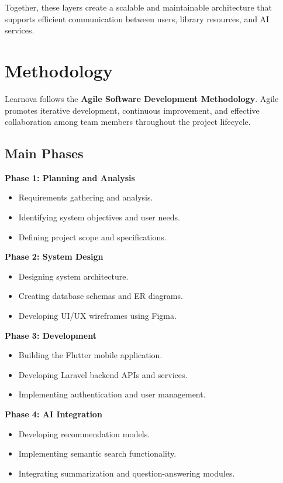 Together, these layers create a scalable and maintainable architecture that
supports efficient communication between users, library resources, and AI
services.

\section{Methodology}
\label{sec:methodology}

Learnova follows the \textbf{Agile Software Development Methodology}. Agile
promotes iterative development, continuous improvement, and effective
collaboration among team members throughout the project lifecycle.

\subsection{Main Phases}

\textbf{Phase 1: Planning and Analysis}
\begin{itemize}
  \item Requirements gathering and analysis.
  \item Identifying system objectives and user needs.
  \item Defining project scope and specifications.
\end{itemize}

\textbf{Phase 2: System Design}
\begin{itemize}
  \item Designing system architecture.
  \item Creating database schemas and ER diagrams.
  \item Developing UI/UX wireframes using Figma.
\end{itemize}

\textbf{Phase 3: Development}
\begin{itemize}
  \item Building the Flutter mobile application.
  \item Developing Laravel backend APIs and services.
  \item Implementing authentication and user management.
\end{itemize}

\textbf{Phase 4: AI Integration}
\begin{itemize}
  \item Developing recommendation models.
  \item Implementing semantic search functionality.
  \item Integrating summarization and question-answering modules.
\end{itemize}


